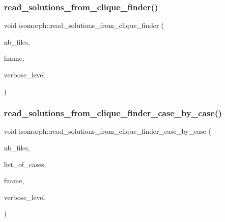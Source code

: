 \subsubsection{\texorpdfstring{read\+\_\+solutions\+\_\+from\+\_\+clique\+\_\+finder()}{read\_solutions\_from\_clique\_finder()}}
{\footnotesize\ttfamily void isomorph\+::read\+\_\+solutions\+\_\+from\+\_\+clique\+\_\+finder (\begin{DoxyParamCaption}\item[{\mbox{\hyperlink{galois_8h_a09fddde158a3a20bd2dcadb609de11dc}{I\+NT}}}]{nb\+\_\+files,  }\item[{const \mbox{\hyperlink{galois_8h_ab6cc7b4aeb6ea31aba2b3fbfc83ff5e6}{B\+Y\+TE}} $\ast$$\ast$}]{fname,  }\item[{\mbox{\hyperlink{galois_8h_a09fddde158a3a20bd2dcadb609de11dc}{I\+NT}}}]{verbose\+\_\+level }\end{DoxyParamCaption})}

\mbox{\label{classisomorph_a65bc5ec528f741a1b01cdd606dfed579}} 
\subsubsection{\texorpdfstring{read\+\_\+solutions\+\_\+from\+\_\+clique\+\_\+finder\+\_\+case\+\_\+by\+\_\+case()}{read\_solutions\_from\_clique\_finder\_case\_by\_case()}}
{\footnotesize\ttfamily void isomorph\+::read\+\_\+solutions\+\_\+from\+\_\+clique\+\_\+finder\+\_\+case\+\_\+by\+\_\+case (\begin{DoxyParamCaption}\item[{\mbox{\hyperlink{galois_8h_a09fddde158a3a20bd2dcadb609de11dc}{I\+NT}}}]{nb\+\_\+files,  }\item[{\mbox{\hyperlink{galois_8h_a09fddde158a3a20bd2dcadb609de11dc}{I\+NT}} $\ast$}]{list\+\_\+of\+\_\+cases,  }\item[{const \mbox{\hyperlink{galois_8h_ab6cc7b4aeb6ea31aba2b3fbfc83ff5e6}{B\+Y\+TE}} $\ast$$\ast$}]{fname,  }\item[{\mbox{\hyperlink{galois_8h_a09fddde158a3a20bd2dcadb609de11dc}{I\+NT}}}]{verbose\+\_\+level }\end{DoxyParamCaption})}

